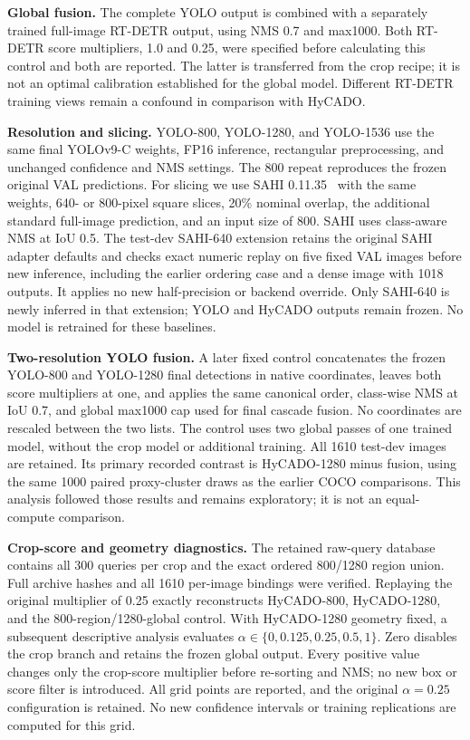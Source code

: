 \documentclass[journal]{IEEEtran}
\begin{document}
\textbf{Global fusion.} The complete YOLO output is combined with a separately trained full-image RT-DETR output, using NMS 0.7 and max1000. Both RT-DETR score multipliers, 1.0 and 0.25, were specified before calculating this control and both are reported. The latter is transferred from the crop recipe; it is not an optimal calibration established for the global model. Different RT-DETR training views remain a confound in comparison with HyCADO.

\textbf{Resolution and slicing.} YOLO-800, YOLO-1280, and YOLO-1536 use the same final YOLOv9-C weights, FP16 inference, rectangular preprocessing, and unchanged confidence and NMS settings. The 800 repeat reproduces the frozen original VAL predictions. For slicing we use SAHI 0.11.35~\cite{akyon2022sahi} with the same weights, 640- or 800-pixel square slices, 20\% nominal overlap, the additional standard full-image prediction, and an input size of 800. SAHI uses class-aware NMS at IoU 0.5. The test-dev SAHI-640 extension retains the original SAHI adapter defaults and checks exact numeric replay on five fixed VAL images before new inference, including the earlier ordering case and a dense image with 1018 outputs. It applies no new half-precision or backend override. Only SAHI-640 is newly inferred in that extension; YOLO and HyCADO outputs remain frozen. No model is retrained for these baselines.

\textbf{Two-resolution YOLO fusion.} A later fixed control concatenates the frozen YOLO-800 and YOLO-1280 final detections in native coordinates, leaves both score multipliers at one, and applies the same canonical order, class-wise NMS at IoU 0.7, and global max1000 cap used for final cascade fusion. No coordinates are rescaled between the two lists. The control uses two global passes of one trained model, without the crop model or additional training. All 1610 test-dev images are retained. Its primary recorded contrast is HyCADO-1280 minus fusion, using the same 1000 paired proxy-cluster draws as the earlier COCO comparisons. This analysis followed those results and remains exploratory; it is not an equal-compute comparison.

\textbf{Crop-score and geometry diagnostics.} The retained raw-query database contains all 300 queries per crop and the exact ordered 800/1280 region union. Full archive hashes and all 1610 per-image bindings were verified. Replaying the original multiplier of 0.25 exactly reconstructs HyCADO-800, HyCADO-1280, and the 800-region/1280-global control. With HyCADO-1280 geometry fixed, a subsequent descriptive analysis evaluates $\alpha\in\{0,0.125,0.25,0.5,1\}$. Zero disables the crop branch and retains the frozen global output. Every positive value changes only the crop-score multiplier before re-sorting and NMS; no new box or score filter is introduced. All grid points are reported, and the original $\alpha=0.25$ configuration is retained. No new confidence intervals or training replications are computed for this grid.
\end{document}
